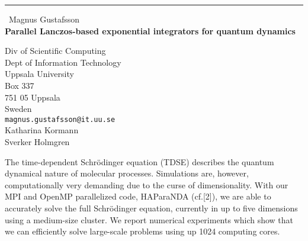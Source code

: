 \documentclass{report}
\begin{document}
\begin{center}
\rule{6in}{1pt} \
{\large Magnus Gustafsson \\
{\bf Parallel Lanczos-based exponential integrators for quantum dynamics}}

Div of Scientific Computing \\ Dept of Information Technology \\ Uppsala University \\ Box 337 \\ 751 05 Uppsala \\ Sweden
\\
{\tt magnus.gustafsson@it.uu.se}\\
Katharina Kormann\\
Sverker Holmgren\end{center}

The time-dependent Schr{\"o}dinger equation (TDSE) describes the quantum
dynamical nature of molecular processes. Simulations are, however,
computationally very demanding due to the curse of dimensionality. With
our MPI and OpenMP parallelized code, HAParaNDA (cf.[2]), we are able to
accurately solve the full Schr{\"o}dinger equation, currently in up to
five dimensions using a medium-size cluster. We report numerical
experiments which show that we can efficiently solve large-scale problems
using up 1024 computing cores.
\end{document}

